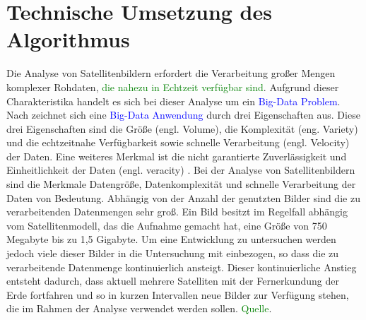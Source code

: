 \chapter{Technische Umsetzung des Algorithmus}
Die Analyse von Satellitenbildern erfordert die Verarbeitung großer Mengen komplexer Rohdaten, \textcolor{green}{die nahezu in Echtzeit verfügbar sind}. Aufgrund dieser Charakteristika handelt es sich bei dieser Analyse um ein \textcolor{blue}{Big-Data Problem}. Nach \cite{Laney2001} zeichnet sich eine \textcolor{blue}{Big-Data Anwendung} durch drei Eigenschaften aus. Diese drei Eigenschaften sind die Größe (engl. Volume), die Komplexität (eng. Variety) und die echtzeitnahe Verfügbarkeit sowie schnelle Verarbeitung (engl. Velocity) der Daten. Eine weiteres Merkmal ist die nicht garantierte Zuverlässigkeit und Einheitlichkeit der Daten (engl. veracity) \cite{Zikopoulos2012}. 
\newline
Bei der Analyse von Satellitenbildern sind die Merkmale Datengröße, Datenkomplexität und schnelle Verarbeitung der Daten von Bedeutung. Abhängig von der Anzahl der genutzten Bilder sind die zu verarbeitenden Datenmengen sehr groß. Ein Bild besitzt im Regelfall abhängig vom Satellitenmodell, das die Aufnahme gemacht hat, eine Größe von 750 Megabyte bis zu 1,5 Gigabyte. Um eine Entwicklung zu untersuchen werden jedoch viele dieser Bilder in die Untersuchung mit einbezogen, so dass die zu verarbeitende Datenmenge kontinuierlich ansteigt. Dieser kontinuierliche Anstieg entsteht dadurch, dass aktuell mehrere Satelliten mit der Fernerkundung der Erde fortfahren und so in kurzen Intervallen neue Bilder zur Verfügung stehen, die im Rahmen der Analyse verwendet werden sollen. \textcolor{green}{Quelle}.

